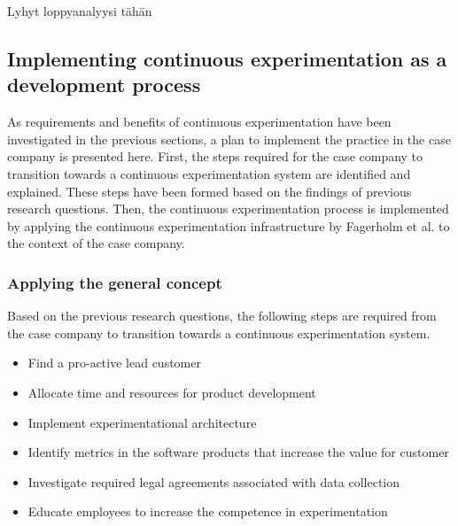 \documentclass[english]{tktltiki2}
\theoremstyle{definition}
\theoremstyle{remark}
\begin{document}
Lyhyt loppyanalyysi tähän

\subsection{Implementing continuous experimentation as a development process}

As requirements and benefits of continuous experimentation have been investigated in the previous sections, a plan to implement the practice in the case company is presented here. First, the steps required for the case company to transition towards a continuous experimentation system are identified and explained. These steps have been formed based on the findings of previous research questions. Then, the continuous experimentation process is implemented by applying the continuous experimentation infrastructure by Fagerholm et al. \cite{fagerholm2014building} to the context of the case company. %

\subsubsection{Applying the general concept}


Based on the previous research questions, the following steps are required from the case company to transition towards a continuous experimentation system.

\begin{itemize}
\item Find a pro-active lead customer
\item Allocate time and resources for product development
\item Implement experimentational architecture
\item Identify metrics in the software products that increase the value for customer
\item Investigate required legal agreements associated with data collection
\item Educate employees to increase the competence in experimentation
\end{itemize}
\end{document}
